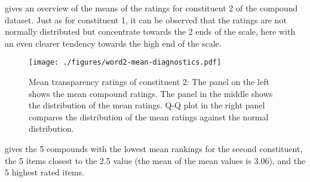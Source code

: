  gives an overview of the
means of the ratings for constituent 2 of the compound dataset. Just
as for constituent 1,  it can be observed that the ratings are not normally distributed
but concentrate towards the 2 ends of the scale, here with an even
clearer tendency towards the high end of the scale.

\begin{figure}[!htb]
  \centering
\texttt{[image: ./figures/word2-mean-diagnostics.pdf]}
  
  \caption{Mean transparency ratings of constituent 2: The panel on
    the left shows the mean compound ratings. The panel in the middle shows the distribution of the mean ratings. Q-Q plot in the right
    panel compares the distribution of the mean
    ratings against the normal distribution.}
  \label{fig:reddy-means-constituent-2}
\end{figure}
 gives the 5 compounds with the lowest mean rankings for the second constituent, the 5 items
closest to the 2.5 value (the mean of the mean values is 3.06), and the 5 highest
rated items. 


